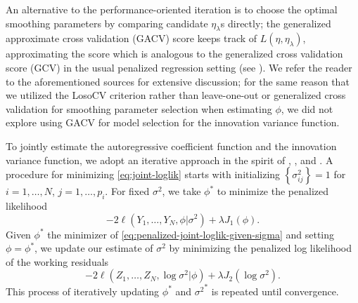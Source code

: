 \bigskip

An alternative to the performance-oriented iteration is to choose the optimal smoothing parameters by comparing candidate $\eta_\lambda$s directly; the generalized approximate cross validation (GACV) score \cite{xiang1996generalized} keeps track of $L\left(\eta, \eta_\lambda\right)$, approximating the score which is analogous to the generalized cross validation score (GCV) in the usual penalized regression setting (see \citep{wahba1990spline}). We refer the reader to the aforementioned sources for extensive discussion; for the same reason that we utilized the LosoCV criterion rather than leave-one-out or generalized cross validation for smoothing parameter selection when estimating $\phi$, we did not explore using GACV for model selection for the innovation variance function.

\bigskip

To jointly estimate the autoregressive coefficient function and the innovation variance function, we adopt an iterative approach in the spirit of \cite{huang2006covariance}, \cite{huang2007estimation}, and \cite{pourahmadi2000maximum}. A procedure for minimizing \ref{eq:joint-loglik} starts with initializing $\left\{\sigma^2_{ij}\right\} = 1$ for $i = 1,\dots, N$, $j = 1,\dots, p_i$.  For fixed $\sigma^2$, we take $\phi^*$ to minimize the penalized likelihood 
\[
-2\ell\left( Y_1,\dots, Y_N, \phi \vert \sigma^2\right) + \lambda J_1\left(\phi\right).
\]
\noindent
Given $\phi^*$ the minimizer of \ref{eq:penalized-joint-loglik-given-sigma} and setting $\phi = \phi^*$, we update our estimate of $\sigma^2$ by minimizing the penalized log likelihood of the working residuals  
\[
-2\ell\left( Z_1,\dots, Z_N, \log\sigma^2 \vert \phi \right) + \lambda J_2\left(\log\sigma^2\right).
\]
This process of iteratively updating $\phi^*$ and ${\sigma^2}^*$ is repeated until convergence. 
\bigskip
%
%
%
